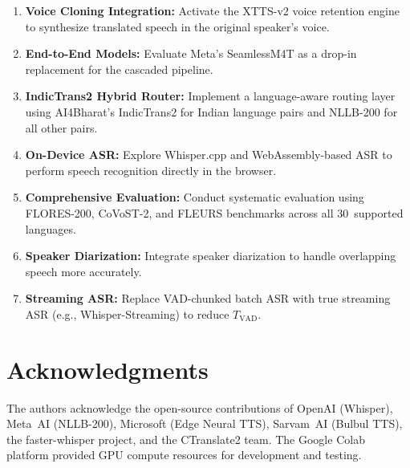 \documentclass[conference]{IEEEtran}
\begin{document}
\begin{enumerate}
  \item \textbf{Voice Cloning Integration:} Activate the XTTS-v2 voice retention engine to synthesize translated speech in the original speaker's voice.

  \item \textbf{End-to-End Models:} Evaluate Meta's SeamlessM4T as a drop-in replacement for the cascaded pipeline.

  \item \textbf{IndicTrans2 Hybrid Router:} Implement a language-aware routing layer using AI4Bharat's IndicTrans2 for Indian language pairs and NLLB-200 for all other pairs.

  \item \textbf{On-Device ASR:} Explore Whisper.cpp and WebAssembly-based ASR to perform speech recognition directly in the browser.

  \item \textbf{Comprehensive Evaluation:} Conduct systematic evaluation using FLORES-200, CoVoST-2, and FLEURS benchmarks across all 30~supported languages.

  \item \textbf{Speaker Diarization:} Integrate speaker diarization to handle overlapping speech more accurately.

  \item \textbf{Streaming ASR:} Replace VAD-chunked batch ASR with true streaming ASR (e.g., Whisper-Streaming) to reduce $T_{\text{VAD}}$.
\end{enumerate}

\section*{Acknowledgments}

The authors acknowledge the open-source contributions of OpenAI (Whisper), Meta~AI (NLLB-200), Microsoft (Edge Neural TTS), Sarvam~AI (Bulbul TTS), the faster-whisper project, and the CTranslate2 team. The Google Colab platform provided GPU compute resources for development and testing.

\balance
\end{document}

